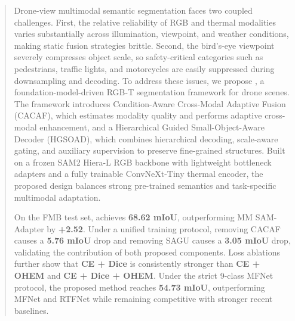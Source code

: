 \begin{abstract}
Drone-view multimodal semantic segmentation faces two coupled challenges. First, the relative reliability of RGB and thermal modalities varies substantially across illumination, viewpoint, and weather conditions, making static fusion strategies brittle. Second, the bird's-eye viewpoint severely compresses object scale, so safety-critical categories such as pedestrians, traffic lights, and motorcycles are easily suppressed during downsampling and decoding. To address these issues, we propose \method{}, a foundation-model-driven RGB-T segmentation framework for drone scenes. The framework introduces Condition-Aware Cross-Modal Adaptive Fusion (CACAF), which estimates modality quality and performs adaptive cross-modal enhancement, and a Hierarchical Guided Small-Object-Aware Decoder (HGSOAD), which combines hierarchical decoding, scale-aware gating, and auxiliary supervision to preserve fine-grained structures. Built on a frozen SAM2 Hiera-L RGB backbone with lightweight bottleneck adapters and a fully trainable ConvNeXt-Tiny thermal encoder, the proposed design balances strong pre-trained semantics and task-specific multimodal adaptation.

On the FMB test set, \method{} achieves \textbf{68.62 mIoU}, outperforming MM SAM-Adapter by \textbf{+2.52}. Under a unified training protocol, removing CACAF causes a \textbf{5.76 mIoU} drop and removing SAGU causes a \textbf{3.05 mIoU} drop, validating the contribution of both proposed components. Loss ablations further show that \textbf{CE + Dice} is consistently stronger than \textbf{CE + OHEM} and \textbf{CE + Dice + OHEM}. Under the strict 9-class MFNet protocol, the proposed method reaches \textbf{54.73 mIoU}, outperforming MFNet and RTFNet while remaining competitive with stronger recent baselines.
\end{abstract}
